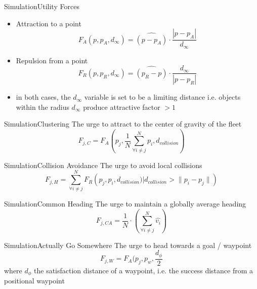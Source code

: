 \documentclass[10pt]{beamer}
\begin{document}
\begin{frame}{Simulation}{Utility Forces}
  \begin{itemize}
    \item Attraction to a point
  \begin{equation}
      F_{A}(p,p_A,d_{\infty})=\widehat{(p-p_A)}\cdot\frac{|p-p_A|}{d_{\infty}} 
  \end{equation}
    \item Repulsion from a point
  \begin{equation}
      F_{R}(p,p_R,d_{\infty})=\widehat{(p_R-p)}\cdot\frac{d_{\infty}}{|p-p_R|}
  \end{equation}
\item in both cases, the $d_\infty$ variable is set to be a limiting distance i.e. objects within the radius $d_\infty$ produce attractive factor $>1$
  \end{itemize}
\end{frame}

\begin{frame}{Simulation}{Clustering}
  The urge to attract to the center of gravity of the fleet
  \begin{equation}
    F_{j,C}= F_A\left(p_j, \frac{1}{N}\sum\limits_{\forall i \ne j}^N{p_i}, d_{collision}\right)
  \end{equation}
\end{frame}

\begin{frame}{Simulation}{Collision Avoidance}
  The urge to avoid local collisions
  \begin{equation}
    F_{j,H}= \sum\limits_{\forall i \ne j}^N F_R\left(p_j, p_i, d_{collision}) \big| d_{collision}>\|p_i-p_j\|\right)
  \end{equation}
\end{frame}
\begin{frame}{Simulation}{Common Heading}
  The urge to maintain a globally average heading
  \begin{equation}
    F_{j,CA}= \frac{1}{N}\cdot\left(\sum\limits_{\forall i \ne j}^N \hat{v_i}\right) 
  \end{equation}
\end{frame}

\begin{frame}{Simulation}{Actually Go Somewhere}
  The urge to head towards a goal / waypoint
  \begin{equation}
    F_{j,W}= F_A(p_j,p_w,\frac{d_{\phi}}{2}
  \end{equation}
  where $d_{\phi}$ the satisfaction distance of a waypoint, i.e. the success distance from a positional waypoint
\end{frame}
\end{document}
